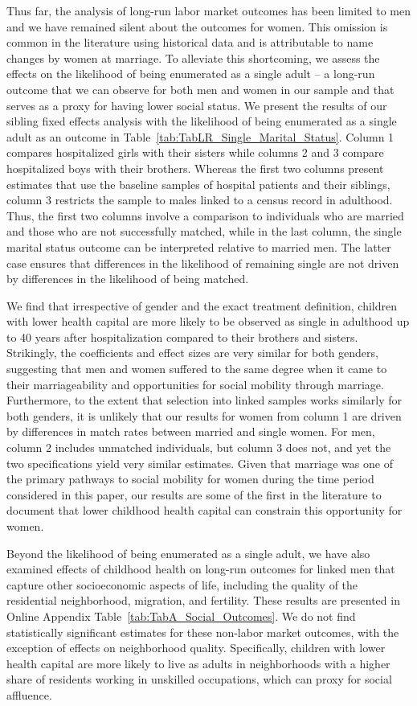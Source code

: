 \documentclass[12pt,english]{article}
\begin{document}
Thus far, the analysis of long-run labor market outcomes has been limited to men and we have remained silent about the outcomes for women. This omission is common in the literature using historical data and is attributable to name changes by women at marriage. To alleviate this shortcoming, we assess the effects on the likelihood of being enumerated as a single adult -- a long-run outcome that we can observe for both men and women in our sample and that serves as a proxy for having lower social status. We present the results of our sibling fixed effects analysis with the likelihood of being enumerated as a single adult as an outcome in Table~\ref{tab:TabLR_Single_Marital_Status}. Column 1 compares hospitalized girls with their sisters while columns 2 and 3 compare hospitalized boys with their brothers. Whereas the first two columns present estimates that use the baseline samples of hospital patients and their siblings, column 3 restricts the sample to males linked to a census record in adulthood. Thus, the first two columns involve a comparison to individuals who are married and those who are not successfully matched, while in the last column, the single marital status outcome can be interpreted relative to married men. The latter case ensures that differences in the likelihood of remaining single are not driven by differences in the likelihood of being matched.

We find that irrespective of gender and the exact treatment definition, children with lower health capital are more likely to be observed as single in adulthood up to 40 years after hospitalization compared to their brothers and sisters. Strikingly, the coefficients and effect sizes are very similar for both genders, suggesting that men and women suffered to the same degree when it came to their marriageability and opportunities for social mobility through marriage. Furthermore, to the extent that selection into linked samples works similarly for both genders, it is unlikely that our results for women from column 1 are driven by differences in match rates between married and single women. For men, column 2 includes unmatched individuals, but column 3 does not, and yet the two specifications yield very similar estimates. Given that marriage was one of the primary pathways to social mobility for women during the time period considered in this paper, our results are some of the first in the literature to document that lower childhood health capital can constrain this opportunity for women.

Beyond the likelihood of being enumerated as a single adult, we have also examined effects of childhood health on long-run outcomes for linked men that capture other socioeconomic aspects of life, including the quality of the residential neighborhood, migration, and fertility. These results are presented in Online Appendix Table~\ref{tab:TabA_Social_Outcomes}. We do not find statistically significant estimates for these non-labor market outcomes, with the exception of effects on neighborhood quality. Specifically, children with lower health capital are more likely to live as adults in neighborhoods with a higher share of residents working in unskilled occupations, which can proxy for social affluence.
\end{document}
